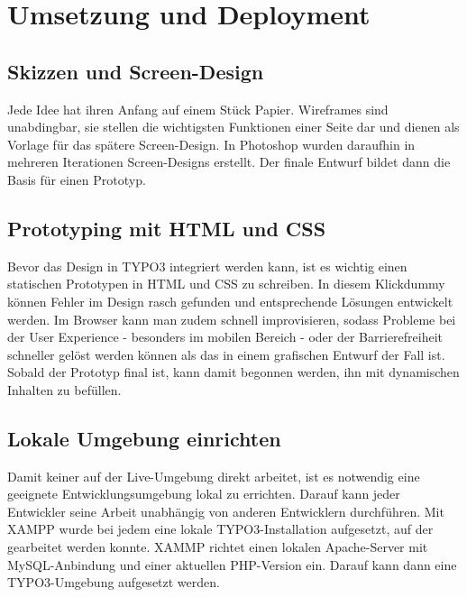 \section{Umsetzung und Deployment} 
\label{sec:Umsetzung und Deployment}

\subsection{Skizzen und Screen-Design}
\label{sec:Skizzen und Screen-Design}
Jede Idee hat ihren Anfang auf einem Stück Papier. Wireframes sind unabdingbar, sie stellen die wichtigsten Funktionen einer 
Seite dar und dienen als Vorlage für das spätere Screen-Design. In Photoshop wurden daraufhin in mehreren Iterationen Screen-Designs
erstellt. Der finale Entwurf bildet dann die Basis für einen Prototyp.

\subsection{Prototyping mit HTML und CSS}
\label{sec:Prototyping mit HTML und CSS}
Bevor das Design in TYPO3 integriert werden kann, ist es wichtig einen statischen Prototypen in HTML und CSS zu schreiben. 
In diesem Klickdummy können Fehler im Design rasch gefunden und entsprechende Lösungen entwickelt werden. Im Browser kann 
man zudem schnell improvisieren, sodass Probleme bei der User Experience - besonders im mobilen Bereich - oder der 
Barrierefreiheit schneller gelöst werden können als das in einem grafischen Entwurf der Fall ist. Sobald der Prototyp final ist,
kann damit begonnen werden, ihn mit dynamischen Inhalten zu befüllen.

\subsection{Lokale Umgebung einrichten}
\label{sec:Lokale Umgebung einrichten}
Damit keiner auf der Live-Umgebung direkt arbeitet, ist es notwendig eine geeignete Entwicklungsumgebung lokal zu errichten.
Darauf kann jeder Entwickler seine Arbeit unabhängig von anderen Entwicklern durchführen. Mit XAMPP wurde bei jedem eine lokale 
TYPO3-Installation aufgesetzt, auf der gearbeitet werden konnte. XAMMP richtet einen lokalen Apache-Server mit MySQL-Anbindung 
und einer aktuellen PHP-Version ein. Darauf kann dann eine TYPO3-Umgebung aufgesetzt werden.

